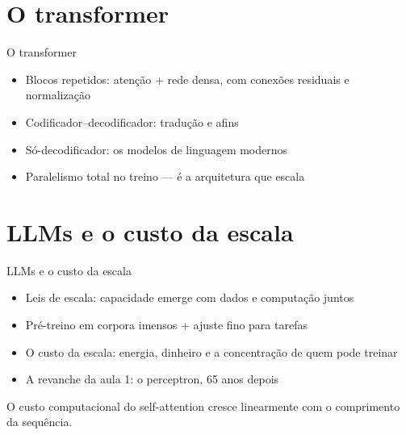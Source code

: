 \documentclass[aspectratio=169, 11pt]{beamer}
\begin{document}
\section{O transformer}

\begin{frame}{O transformer}
  \begin{itemize}\setlength{\itemsep}{0.4ex}
    \item Blocos repetidos: atenção + rede densa, com conexões residuais e
          normalização
    \item Codificador--decodificador: tradução e afins
    \item Só-decodificador: os modelos de linguagem modernos
    \item Paralelismo total no treino — é a arquitetura que escala
  \end{itemize}
\end{frame}

\section{LLMs e o custo da escala}

\begin{frame}{LLMs e o custo da escala}
  \begin{itemize}\setlength{\itemsep}{0.4ex}
    \item Leis de escala: capacidade emerge com dados e computação juntos
    \item Pré-treino em corpora imensos + ajuste fino para tarefas
    \item O custo da escala: energia, dinheiro e a concentração de quem pode
          treinar
    \item A revanche da aula 1: o perceptron, 65 anos depois
  \end{itemize}
  \begin{quizbox}
    O custo computacional do self-attention cresce linearmente com o
    comprimento da sequência.

    \smallskip
  \end{quizbox}
\end{frame}
\end{document}
